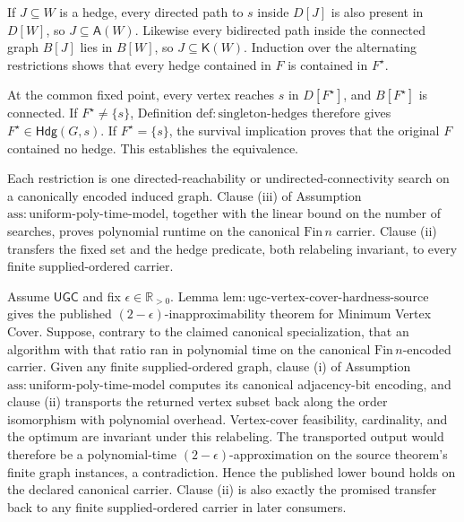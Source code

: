 If \(J\subseteq W\) is a hedge, every directed path to \(s\) inside
\(D[J]\) is also present in \(D[W]\), so \(J\subseteq\mathsf A(W)\).
Likewise every bidirected path inside the connected graph \(B[J]\) lies in
\(B[W]\), so \(J\subseteq\mathsf K(W)\).  Induction over the alternating
restrictions shows that every hedge contained in \(F\) is contained in
\(F^{\star}\).

At the common fixed point, every vertex reaches \(s\) in
\(D[F^{\star}]\), and \(B[F^{\star}]\) is connected.  If
\(F^{\star}\neq\{s\}\), Definition
\(\mathrm{def{:}singleton\mbox{-}hedges}\) therefore gives
\(F^{\star}\in\mathsf{Hdg}(G,s)\).  If
\(F^{\star}=\{s\}\), the survival implication proves that the original
\(F\) contained no hedge.  This establishes the equivalence.

Each restriction is one directed-reachability or undirected-connectivity
search on a canonically encoded induced graph.  Clause (iii) of Assumption
\(\mathrm{ass{:}uniform\mbox{-}poly\mbox{-}time\mbox{-}model}\), together
with the linear bound on the number of searches, proves polynomial runtime
on the canonical \(\mathrm{Fin}\,n\) carrier.  Clause (ii) transfers the
fixed set and the hedge predicate, both relabeling invariant, to every
finite supplied-ordered carrier.

Assume \(\mathsf{UGC}\) and fix
\(\epsilon\in\mathbb R_{>0}\).  Lemma
\(\mathrm{lem{:}ugc\mbox{-}vertex\mbox{-}cover\mbox{-}hardness\mbox{-}source}\)
gives the published \((2-\epsilon)\)-inapproximability theorem for Minimum
Vertex Cover.  Suppose, contrary to the claimed canonical specialization,
that an algorithm with that ratio ran in polynomial time on the canonical
\(\mathrm{Fin}\,n\)-encoded carrier.  Given any finite supplied-ordered
graph, clause (i) of Assumption
\(\mathrm{ass{:}uniform\mbox{-}poly\mbox{-}time\mbox{-}model}\) computes
its canonical adjacency-bit encoding, and clause (ii) transports the
returned vertex subset back along the order isomorphism with polynomial
overhead.  Vertex-cover feasibility, cardinality, and the optimum are
invariant under this relabeling.  The transported output would therefore be
a polynomial-time \((2-\epsilon)\)-approximation on the source theorem's
finite graph instances, a contradiction.  Hence the published lower bound
holds on the declared canonical carrier.  Clause (ii) is also exactly the
promised transfer back to any finite supplied-ordered carrier in later
consumers.

